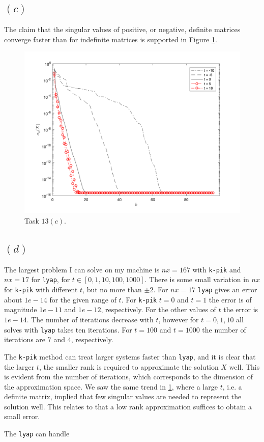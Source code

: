 \subsection*{$(c)$}
The claim that the singular values of positive, or negative, definite matrices converge faster than for indefinite matrices is supported in Figure \ref{13c}.
\begin{figure}[h!]
\centering
\includegraphics[scale=0.5]{task13c.png}
\caption{Task $13(c)$. }
\label{13c}
\end{figure}




\subsection*{$(d)$}
The largest problem I can solve on my machine is $nx = 167$ with \texttt{k-pik} and $nx = 17$ for \texttt{lyap}, for $t\in[0,1,10,100,1000]$. There is some small variation in $nx$ for \texttt{k-pik} with different $t$, but no more than $\pm 2$. For $nx = 17$  \texttt{lyap} gives an error about $1e-14$ for the given range of $t$. For \texttt{k-pik} $t=0$ and $t = 1$ the error is of magnitude $1e-11$ and $1e-12$, respectively. For the other values of $t$ the error is $1e-14$. The number of iterations decrease with $t$, however for $t = 0,1,10$ all solves with \texttt{lyap} takes ten iterations. For $t = 100$ and $t = 1000$ the number of iterations are $7$ and $4$, respectively.

The \texttt{k-pik} method can treat larger systems faster than \texttt{lyap}, and it is clear that the  larger $t$, the smaller rank is required to approximate the  solution $X$ well. This is evident from the number of iterations, which corresponds to the dimension of the approximation space. We saw the same trend in \ref{13c}, where a large $t$, i.e. a definite matrix, implied that few singular values are needed to represent the solution well. This relates to that a low rank approximation suffices to obtain a small error.

The \texttt{lyap} can handle
